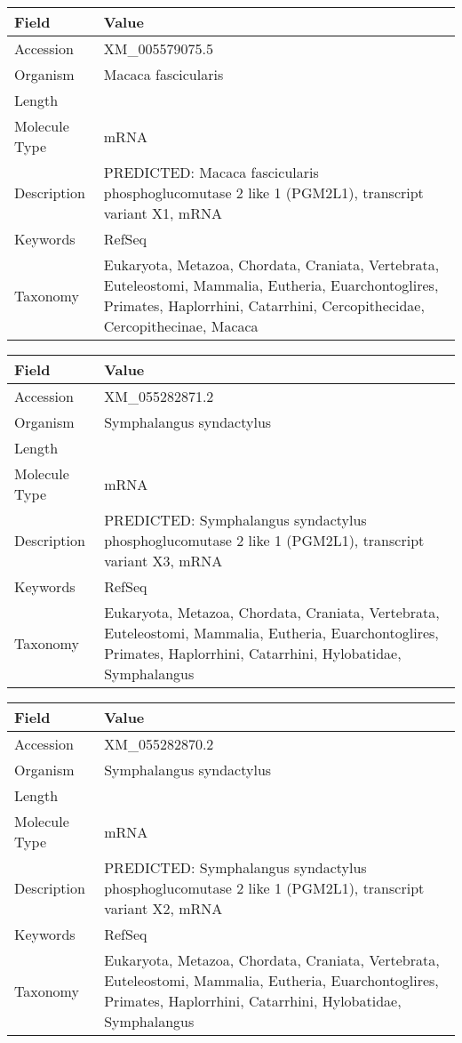 \documentclass[10pt]{article}
\begin{document}
\vspace{1em}
{\footnotesize
\begin{longtable}{>{\raggedright\arraybackslash}p{4.5cm} >{\raggedright\arraybackslash}p{11.5cm}}
\textbf{Field} & \textbf{Value} \\
\hline
Accession & XM\_005579075.5 \\
Organism & Macaca fascicularis \\
Length & 4277 \\
Molecule Type & mRNA \\
Description & PREDICTED: Macaca fascicularis phosphoglucomutase 2 like 1 (PGM2L1), transcript variant X1, mRNA \\
Keywords & RefSeq \\
Taxonomy & Eukaryota, Metazoa, Chordata, Craniata, Vertebrata, Euteleostomi, Mammalia, Eutheria, Euarchontoglires, Primates, Haplorrhini, Catarrhini, Cercopithecidae, Cercopithecinae, Macaca \\
\end{longtable}
}

\vspace{1em}
{\footnotesize
\begin{longtable}{>{\raggedright\arraybackslash}p{4.5cm} >{\raggedright\arraybackslash}p{11.5cm}}
\textbf{Field} & \textbf{Value} \\
\hline
Accession & XM\_055282871.2 \\
Organism & Symphalangus syndactylus \\
Length & 8192 \\
Molecule Type & mRNA \\
Description & PREDICTED: Symphalangus syndactylus phosphoglucomutase 2 like 1 (PGM2L1), transcript variant X3, mRNA \\
Keywords & RefSeq \\
Taxonomy & Eukaryota, Metazoa, Chordata, Craniata, Vertebrata, Euteleostomi, Mammalia, Eutheria, Euarchontoglires, Primates, Haplorrhini, Catarrhini, Hylobatidae, Symphalangus \\
\end{longtable}
}

\vspace{1em}
{\footnotesize
\begin{longtable}{>{\raggedright\arraybackslash}p{4.5cm} >{\raggedright\arraybackslash}p{11.5cm}}
\textbf{Field} & \textbf{Value} \\
\hline
Accession & XM\_055282870.2 \\
Organism & Symphalangus syndactylus \\
Length & 8146 \\
Molecule Type & mRNA \\
Description & PREDICTED: Symphalangus syndactylus phosphoglucomutase 2 like 1 (PGM2L1), transcript variant X2, mRNA \\
Keywords & RefSeq \\
Taxonomy & Eukaryota, Metazoa, Chordata, Craniata, Vertebrata, Euteleostomi, Mammalia, Eutheria, Euarchontoglires, Primates, Haplorrhini, Catarrhini, Hylobatidae, Symphalangus \\
\end{longtable}
}
\end{document}

